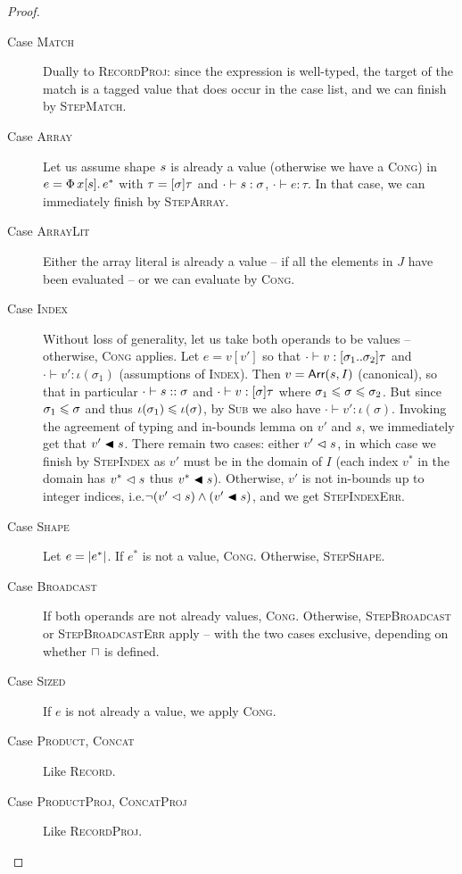 \begin{proof}
\begin{description}
    \item[Case \textsc{Match}] Dually to \textsc{RecordProj}: since the expression is well-typed, the target of the match is a tagged value that does occur in the case list, and we can finish by \textsc{StepMatch}.
    \item[Case \textsc{Array}] Let us assume shape $s$ is already a value (otherwise we have a \textsc{Cong}) in $e = \sbuild{x}{\vess}{e^*}$ with $\tau = \suniarraytype{\sigma}{\tau}$ and $\cdot \vdash s : \sigma$, $\cdot \vdash e : \tau$. In that case, we can immediately finish by \textsc{StepArray}.
    \item[Case \textsc{ArrayLit}] Either the array literal is already a value -- if all the elements in $J$ have been evaluated -- or we can evaluate by \textsc{Cong}.
    \item[Case \textsc{Index}] Without loss of generality, let us take both operands to be values -- otherwise, \textsc{Cong} applies. Let $e = v[v']$ so that $\cdot \vdash v : \sarraytype{\sigma_1}{\sigma_2}{\tau}$ and $\cdot \vdash v' : \iota(\sigma_1)$ (assumptions of \textsc{Index}). Then $v = \textsf{Arr}(s,I)$ (canonical), so that in particular $\cdot \vdash s :: \sigma$ and $\cdot \vdash v : \suniarraytype{\sigma}{\tau}$ where $\sigma_1 \leqslant \sigma \leqslant \sigma_2$. But since $\sigma_1 \leqslant \sigma$ and thus $\iota(\sigma_1) \leqslant \iota(\sigma)$, by \textsc{Sub} we also have $\cdot \vdash v' : \iota(\sigma)$. Invoking the agreement of typing and in-bounds lemma on $v'$ and $s$, we immediately get that $v' \blacktriangleleft s$. There remain two cases: either $v' \vartriangleleft s$, in which case we finish by \textsc{StepIndex} as $v'$ must be in the domain of $I$ (each index $v^*$ in the domain has $v^* \vartriangleleft s$ thus $v^* \blacktriangleleft s$). Otherwise, $v'$ is not in-bounds up to integer indices, i.e.\@ $\lnot(v' \vartriangleleft s) \land (v' \blacktriangleleft s)$, and we get \textsc{StepIndexErr}. 
    \item[Case \textsc{Shape}] Let $e = \sshape{e^*}$. If $e^*$ is not a value, \textsc{Cong}. Otherwise, \textsc{StepShape}.
    \item[Case \textsc{Broadcast}] If both operands are not already values, \textsc{Cong}. Otherwise, \textsc{StepBroadcast} or \textsc{StepBroadcastErr} apply -- with the two cases exclusive, depending on whether $\sqcap$ is defined.
    \item[Case \textsc{Sized}] If $e$ is not already a value, we apply \textsc{Cong}.
    \item[Case \textsc{Product}, \textsc{Concat}] Like \textsc{Record}.
    \item[Case \textsc{ProductProj}, \textsc{ConcatProj}] Like \textsc{RecordProj}.
\end{description}
\end{proof}


